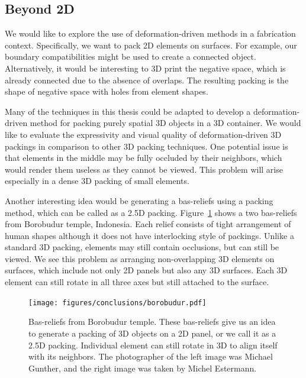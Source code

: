 \subsection{Beyond 2D}

We would like to explore the use of deformation-driven methods in a fabrication context.
Specifically, we want to pack 2D elements on surfaces.
For example, our boundary compatibilities might be used to create a connected object.
Alternatively, it would be interesting to 3D print the 
negative space, which is already connected due to the absence of overlaps.
The resulting packing is the shape of negative space with holes from element shapes.

Many of the techniques in this thesis could be adapted
to develop a deformation-driven method for packing purely spatial
3D objects in a 3D container.  
We would like to evaluate the
expressivity and visual quality of deformation-driven 3D packings 
in comparison to other 3D packing techniques.
One potential issue is that elements in the middle may be fully occluded by their neighbors,
which would render them useless as they cannot be viewed.
This problem will arise especially in a dense 3D packing of small elements.

Another interesting idea would be generating a bas-reliefs using a packing method,
which can be called as a 2.5D packing.
Figure~\ref{borobudur} shows a two bas-reliefs from Borobudur temple, Indonesia.
Each relief consists of tight arrangement of human shapes although it does not 
have interlocking style of packings.
Unlike a standard 3D packing, elements may still contain occlusions, but can still be viewed.
We see this problem as arranging non-overlapping 3D elements on surfaces, 
which include not only 2D panels but also any 3D surfaces.
Each 3D element can still rotate in all three axes but still attached to the surface.



\begin{figure}
\centering
\texttt{[image: figures/conclusions/borobudur.pdf]}
\caption[Element Arrangements in Bas-Reliefs]
{ \label{borobudur} 
\nnewtext
{
Bas-reliefs from Borobudur temple. These
bas-reliefs give us an idea to generate a packing of 3D objects on a 2D panel,
or we call it as a 2.5D packing.
Individual element can still rotate in 3D to align itself with its neighbors.
The photographer of the left image was Michael Gunther, and the right image was taken by Michel Estermann.
}
}
\end{figure}

